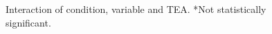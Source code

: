 \documentclass{article}
\begin{document}
\begin{figure}[H]
  \caption{Interaction of condition, variable and TEA. *Not statistically significant.}
  \noindent{}
  \centering
\end{figure}
\end{document}
